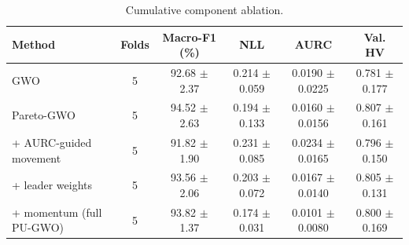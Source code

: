 \begin{table}[t]
\centering
\caption{Cumulative component ablation.}
\label{tab:table6_cumulative_ablation}
\small
\begin{tabular}{lccccc}
\toprule
Method & Folds & Macro-F1 (\%) & NLL & AURC & Val. HV \\
\midrule
GWO & 5 & 92.68 $\pm$ 2.37 & 0.214 $\pm$ 0.059 & 0.0190 $\pm$ 0.0225 & 0.781 $\pm$ 0.177 \\
Pareto-GWO & 5 & 94.52 $\pm$ 2.63 & 0.194 $\pm$ 0.133 & 0.0160 $\pm$ 0.0156 & 0.807 $\pm$ 0.161 \\
+ AURC-guided movement & 5 & 91.82 $\pm$ 1.90 & 0.231 $\pm$ 0.085 & 0.0234 $\pm$ 0.0165 & 0.796 $\pm$ 0.150 \\
+ leader weights & 5 & 93.56 $\pm$ 2.06 & 0.203 $\pm$ 0.072 & 0.0167 $\pm$ 0.0140 & 0.805 $\pm$ 0.131 \\
+ momentum (full PU-GWO) & 5 & 93.82 $\pm$ 1.37 & 0.174 $\pm$ 0.031 & 0.0101 $\pm$ 0.0080 & 0.800 $\pm$ 0.169 \\
\bottomrule
\end{tabular}
\end{table}
